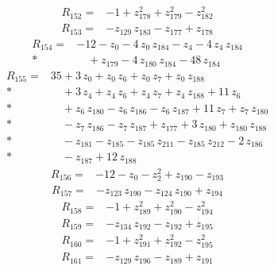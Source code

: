 \documentclass[10pt]{article}
\begin{document}
\begin{align*}
R_{152}={}& - 1 + z_{178}^{2} + z_{179}^{2} - z_{182}^{2}
\end{align*}
\begin{align*}
R_{153}={}& - z_{129}\,z_{183} - z_{177} + z_{178}
\end{align*}
\begin{align*}
R_{154}={}& - 12 - z_{0} - 4\,z_{0}\,z_{184} - z_{4} - 4\,z_{4}\,z_{184} \\*
&\quad + z_{179} - 4\,z_{180}\,z_{184} - 48\,z_{184}
\end{align*}
\begin{align*}
R_{155}={}& 35 + 3\,z_{0} + z_{0}\,z_{6} + z_{0}\,z_{7} + z_{0}\,z_{188} \\*
&\quad + 3\,z_{4} + z_{4}\,z_{6} + z_{4}\,z_{7} + z_{4}\,z_{188} + 11\,z_{6} \\*
&\quad + z_{6}\,z_{180} - z_{6}\,z_{186} - z_{6}\,z_{187} + 11\,z_{7} + z_{7}\,z_{180} \\*
&\quad - z_{7}\,z_{186} - z_{7}\,z_{187} + z_{177} + 3\,z_{180} + z_{180}\,z_{188} \\*
&\quad - z_{181} - z_{185} - z_{185}\,z_{211} - z_{185}\,z_{212} - 2\,z_{186} \\*
&\quad - z_{187} + 12\,z_{188}
\end{align*}
\begin{align*}
R_{156}={}& - 12 - z_{0} - z_{2}^{2} + z_{190} - z_{193}
\end{align*}
\begin{align*}
R_{157}={}& - z_{123}\,z_{190} - z_{124}\,z_{190} + z_{194}
\end{align*}
\begin{align*}
R_{158}={}& - 1 + z_{189}^{2} + z_{190}^{2} - z_{194}^{2}
\end{align*}
\begin{align*}
R_{159}={}& - z_{134}\,z_{192} - z_{192} + z_{195}
\end{align*}
\begin{align*}
R_{160}={}& - 1 + z_{191}^{2} + z_{192}^{2} - z_{195}^{2}
\end{align*}
\begin{align*}
R_{161}={}& - z_{129}\,z_{196} - z_{189} + z_{191}
\end{align*}
\end{document}
